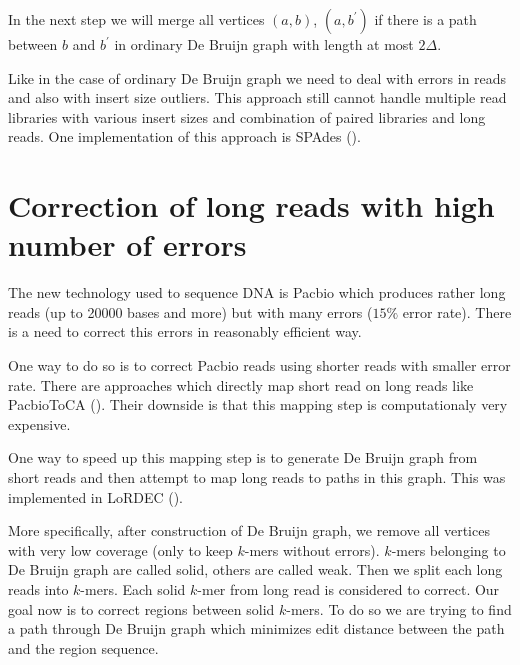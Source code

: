 In the next step we will merge all vertices $(a, b)$, $(a, b^{'})$ if there is a path
between $b$ and $b^{'}$ in ordinary De Bruijn graph with length at most $2\Delta$.

\bigskip
Like in the case of ordinary De Bruijn graph we need to deal with errors in reads
and also with insert size outliers. This approach still cannot handle multiple
read libraries with various insert sizes and combination of paired libraries and long reads.
One implementation of this approach is SPAdes (\cite{Spades}).


\section{Correction of long reads with high number of errors}

The new technology used to sequence DNA is Pacbio which produces
rather long reads (up to 20000 bases and more) but with many errors
($15\%$ error rate). There is a need to correct this errors in reasonably
efficient way.

One way to do so is to correct Pacbio reads using shorter reads with smaller
error rate. There are approaches which directly map short read on long reads like
PacbioToCA (\cite{PacbioToCA}). Their downside is that this mapping step
is computationaly very expensive.

One way to speed up this mapping step is to generate De Bruijn graph from short reads
and then attempt to map long reads to paths in this graph. This was implemented
in LoRDEC (\cite{Lordec}).

More specifically, after construction of De Bruijn graph, we remove all vertices
with very low coverage (only to keep $k$-mers without errors). $k$-mers belonging
to De Bruijn graph are called solid, others are called weak.
Then we split each long reads into $k$-mers. Each solid $k$-mer from long read is considered to correct. 
Our goal now is to correct regions between solid $k$-mers. To do so we are trying
to find a path through De Bruijn graph which minimizes edit distance between the path
and the region sequence. 
